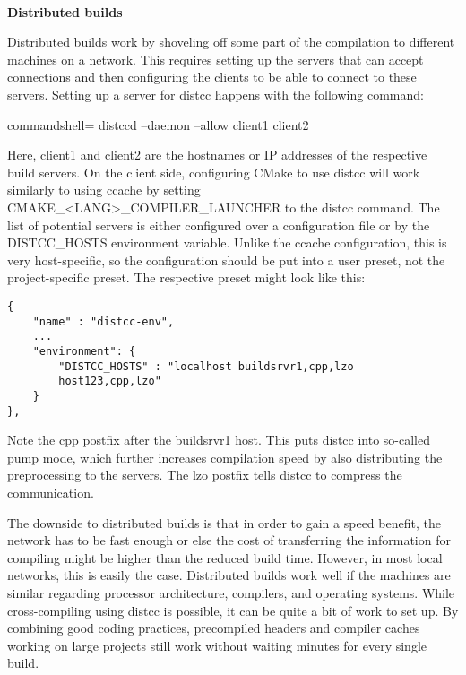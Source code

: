 \hspace*{\fill} \\ %
\noindent
\textbf{Distributed builds}

Distributed builds work by shoveling off some part of the compilation to different machines on a network. This requires setting up the servers that can accept connections and then configuring the clients to be able to connect to these servers. Setting up a server for distcc happens with the following command:

\begin{tcblisting}{commandshell={}}
distccd --daemon --allow client1 client2
\end{tcblisting}

Here, client1 and client2 are the hostnames or IP addresses of the respective build servers. On the client side, configuring CMake to use distcc will work similarly to using ccache by setting CMAKE\_<LANG>\_COMPILER\_LAUNCHER to the distcc command. The list of potential servers is either configured over a configuration file or by the DISTCC\_HOSTS environment variable. Unlike the ccache configuration, this is very host-specific, so the configuration should be put into a user preset, not the project-specific preset. The respective preset might look like this:

\begin{lstlisting}[style=styleCMake]
{
	"name" : "distcc-env",
	...
	"environment": {
		"DISTCC_HOSTS" : "localhost buildsrvr1,cpp,lzo
		host123,cpp,lzo"
	}
},
\end{lstlisting}

Note the cpp postfix after the buildsrvr1 host. This puts distcc into so-called pump mode, which further increases compilation speed by also distributing the preprocessing to the servers. The lzo postfix tells distcc to compress the communication.

The downside to distributed builds is that in order to gain a speed benefit, the network has to be fast enough or else the cost of transferring the information for compiling might be higher than the reduced build time. However, in most local networks, this is easily the case. Distributed builds work well if the machines are similar regarding processor architecture, compilers, and operating systems. While cross-compiling using distcc is possible, it can be quite a bit of work to set up. By combining good coding practices, precompiled headers and compiler caches working on large projects still work without waiting minutes for every single build.











